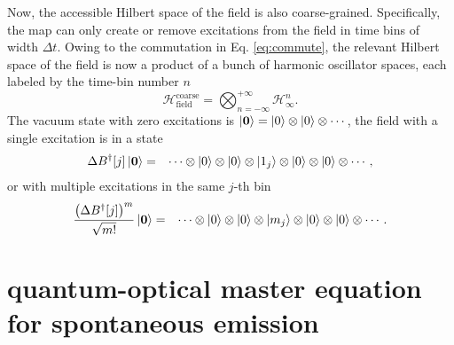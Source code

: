 \documentclass[%
 onecolumn,
 notitlepage,
 longbibliography,
 amsmath,amssymb,
 aps,
 pra,
 10pt,
]{revtex4-1}
\begin{document}
Now, the accessible Hilbert space of the field is also coarse-grained. Specifically, the map can only create or remove excitations from the field in time bins of width $\Delta t$. Owing to the commutation in Eq. \ref{eq:commute}, the relevant Hilbert space of the field is now a product of a bunch of harmonic oscillator spaces, each labeled by the time-bin number $n$ 
\begin{equation}
\mathcal{H}_\textrm{field}^\textrm{coarse}=\bigotimes_{n=-\infty}^{+\infty} \mathcal{H}_\infty^n.
\end{equation}
The vacuum state with zero excitations is $\ket{\mathbf{0}}=\ket{0}\otimes\ket{0}\otimes\cdots$, the field with a single excitation is in a state
\begin{eqnarray}
\Delta B^\dagger[j]\ket{\mathbf{0}} &=& \cdots\otimes\ket{ 0}\otimes\ket{ 0}\otimes\ket{1_j}\otimes\ket{ 0}\otimes\ket{ 0}\otimes\cdots,
\end{eqnarray}
or with multiple excitations in the same $j$-th bin
\begin{eqnarray}
\frac{\left(\Delta B^\dagger[j]\right)^m}{\sqrt{m!}}\ket{\mathbf{0}} &=& \cdots\otimes\ket{ 0}\otimes\ket{ 0}\otimes\ket{m_j}\otimes\ket{ 0}\otimes\ket{ 0}\otimes\cdots.
\end{eqnarray}

\section{quantum-optical master equation for spontaneous emission}
\end{document}
